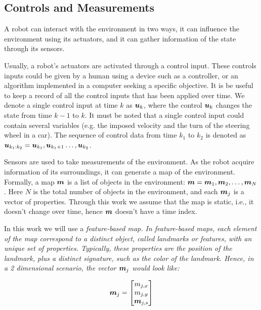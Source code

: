 \subsection{Controls and Measurements}

A robot can interact with the environment in two ways, it can influence the environment using its actuators, and it can gather information of the state through its sensors. 

Usually, a robot's actuators are activated through a control input. These controls inputs could be given by a human using a device such as a controller, or an algorithm implemented in a computer seeking a specific objective. It is be useful to keep a record of all the control inputs that has been applied over time. We denote a single control input at time $k$ as $\boldsymbol{u}_k$, where the control $\boldsymbol{u}_k$ changes the state from  time $k-1$ to $k$. It must be noted that a single control input could contain several variables (e.g. the imposed velocity and the turn of the steering wheel in a car). The sequence of control data from time $k_1$ to $k_2$ is denoted as $\boldsymbol{u}_{k_1:k_2}= \boldsymbol{u}_{k_1},\boldsymbol{u}_{k_1+1}\dots,\boldsymbol{u}_{k_2}$.

Sensors are used to take measurements of the environment. As the robot acquire information of its surroundings, it can generate a map of the environment. Formally, a map $\boldsymbol{m}$ is a list of objects in the environment: $\boldsymbol{m}=\boldsymbol{m}_1,\boldsymbol{m}_2,\dots,\boldsymbol{m}_N$. Here $N$ is the total number of objects in the environment, and each $\boldsymbol{m}_j$ is a vector of properties. Through this work we assume that the map is static, i.e., it doesn't change over time, hence $\boldsymbol{m}$ doesn't have a time index.

In this work we will use a \it{feature-based} map. In feature-based maps, each element of the map correspond to a distinct object, called \it{landmarks} or \it{features}, with an unique set of properties. Typically, these properties are the position of the landmark, plus a distinct signature, such as the color of the landmark. Hence, in a 2 dimensional scenario, the vector $\boldsymbol{m}_j$ would look like:

\begin{equation}
\boldsymbol{m}_j = \begin{bmatrix}
m_{j,x}\\
m_{j,y}\\
\boldsymbol{m}_{j,s}
\end{bmatrix}
\end{equation} 

